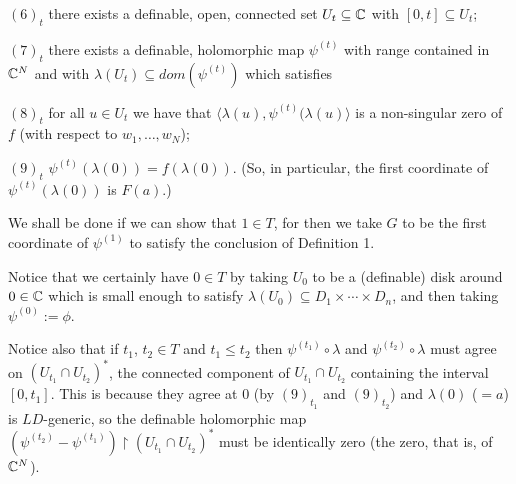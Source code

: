 \documentclass[12pt,nodate]{article}
\begin{document}
 \noindent
$(6)_t$ \hspace{2mm} there exists a definable, open, connected set $U_{t} \subseteq \mathbb{C}$ with $[0, t] \subseteq U_t$;
 
 \vspace{2mm}
 
 \noindent
$(7)_t$ \hspace{2mm} there exists a definable, holomorphic map $\psi^{(t)}$ with range contained in $\mathbb{C}^N$ and with $\lambda (U_t ) \subseteq dom(\psi^{(t)})$ which satisfies
 
 \vspace{2mm}
 
\noindent
$(8)_t$ \hspace{2mm} for all $u \in U_t$ we have that $\langle \lambda (u) , \psi^{(t)} (\lambda (u) \rangle$ is a non-singular zero of $f$ (with respect to $w_1 , \ldots , w_{N}$);

\vspace{2mm}

\noindent
$(9)_t$ \hspace{2mm} $\psi^{(t)} (\lambda (0)) = f( \lambda (0))$. (So, in particular, the first coordinate of $\psi^{(t)} (\lambda (0))$ is $F(a)$.)
 
 \vspace{3mm}
 
 We shall be done if we can show that $1 \in T$, for then we take $G$ to be the first coordinate of $\psi^{(1)}$ to satisfy the conclusion of Definition 1.
 
 \vspace{3mm}
 
 Notice that we certainly have $0 \in T$ by taking $U_0$ to be a (definable) disk around $0 \in \mathbb{C}$ which is small enough to satisfy $\lambda (U_0 ) \subseteq D_1 \times \cdots \times D_n$, and then taking $\psi^{(0)} := \phi$.
 
 Notice also that if $t_1$, $t_2 \in T$ and $t_1 \leq t_2$ then $\psi^{(t_1 )} \circ \lambda$ and $\psi^{(t_2 )} \circ \lambda$ must agree on $(U_{t_1} \cap U_{t_2})^*$, the connected component of $U_{t_1} \cap U_{t_2}$ containing the interval $[0, t_1 ]$. This is because they agree at $0$ (by $(9)_{t_1}$ and $(9)_{t_2}$) and $\lambda (0)$ ($= a$) is $LD$-generic, so the definable holomorphic map \\$(\psi^{(t_2 )} - \psi^{(t_1 )})$$\upharpoonright$$(U_{t_1} \cap U_{t_2})^*$ must be identically zero (the zero, that is, of $\mathbb{C}^N$).
 
 \vspace{1mm}
 
\end{document}
